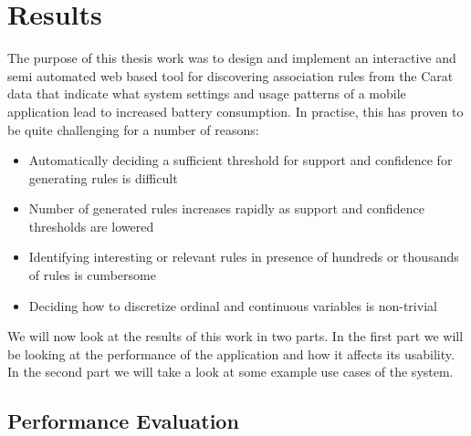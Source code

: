 \section{Results}

The purpose of this thesis work was to design and implement an interactive and semi automated web based tool for discovering association rules from the Carat data that indicate what system settings and usage patterns of a mobile application lead to increased battery consumption. In practise, this has proven to be quite challenging for a number of reasons:

\begin{itemize}
  \item Automatically deciding a sufficient threshold for support and confidence for generating rules is difficult 
  \item Number of generated rules increases rapidly as support and confidence thresholds are lowered
  \item Identifying interesting or relevant rules in presence of hundreds or thousands of rules is cumbersome
  \item Deciding how to discretize ordinal and continuous variables is non-trivial          
\end{itemize}

We will now look at the results of this work in two parts. In the first part we will be looking at the performance of the application and how it affects its usability. In the second part we will take a look at some example use cases of the system.  

\subsection{Performance Evaluation}

